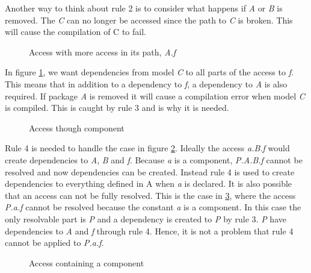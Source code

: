 \documentclass{cslthse-msc}
\begin{document}
Another way to think about rule 2 is to consider what happens if \textit{A} or \textit{B} is removed. The \textit{C} can no longer be accessed since the path to \textit{C} is broken. This will cause the compilation of C to fail.

\begin{figure}[!htbp]
    \centering
    \qquad
    \caption{Access with more access in its path, \textit{A.f}}
    \label{fig:dotAccess}
\end{figure}

In figure \ref{fig:dotAccess}, we want dependencies from model \textit{C} to all parts of the access to \textit{f}. This means that in addition to a dependency to \textit{f}, a dependency to \textit{A} is also required. If package \textit{A} is removed it will cause a compilation error when model \textit{C} is compiled. This is caught by rule 3 and is why it is needed.


\begin{figure}[!htbp]
    \centering
    \qquad
    \subfloat{\raisebox{4.7 cm}{}}
    \caption{Access though component}
    \label{fig:component}
\end{figure}

Rule 4 is needed to handle the case in figure \ref{fig:component}. Ideally the access \textit{a.B.f} would create dependencies to \textit{A}, \textit{B} and \textit{f}. Because \textit{a} is a component, \textit{P.A.B.f} cannot be resolved and now dependencies can be created. Instead rule 4 is used to create dependencies to everything defined in A when \textit{a} is declared.
It is also possible that an access can not be fully resolved. This is the case in \ref{fig:brokenAccess}, where the access \textit{P.a.f} cannot be resolved because the constant \textit{a} is a component. In this case the only resolvable part is \textit{P} and a  dependency is created to \textit{P} by rule 3. \textit{P} have dependencies to \textit{A} and \textit{f} through rule 4. Hence, it is not a problem that rule 4 cannot be applied to \textit{P.a.f}.

\begin{figure}[!htbp]
    \centering
    \qquad
    \subfloat{\raisebox{4.0 cm}{}}
    \caption{Access containing a component}
    \label{fig:brokenAccess}
\end{figure}
\end{document}

